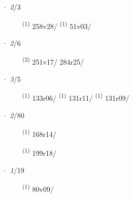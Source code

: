 \ENTRYEND
\noindent{} · \textit{2}/3 \LEMMALINE
\begin{description}
    \item[]  \textsuperscript{(1)} \mbox{258v28/} \CASEBREAK {} \textsuperscript{(1)} \mbox{51v03/}
\end{description}
\ENTRYEND
\noindent{} · \textit{2}/6 \LEMMALINE
\begin{description}
    \item[]  \textsuperscript{(2)} \mbox{251v17/} \mbox{284r25/}
\end{description}
\ENTRYEND
\noindent{} · \textit{3}/5 \LEMMALINE
\begin{description}
    \item[]  \textsuperscript{(1)} \mbox{133r06/} \CASEBREAK {} \textsuperscript{(1)} \mbox{131r11/} \CASEBREAK {} \textsuperscript{(1)} \mbox{131r09/}
\end{description}
\ENTRYEND
\noindent{} · \textit{2}/80 \LEMMALINE
\begin{description}
    \item[]  \textsuperscript{(1)} \mbox{168r14/}
    \item[]  \textsuperscript{(1)} \mbox{199r18/}
\end{description}
\ENTRYEND
\noindent{} · \textit{1}/19 \LEMMALINE
\begin{description}
    \item[]  \textsuperscript{(1)} \mbox{80v09/}
\end{description}
\ENTRYEND
